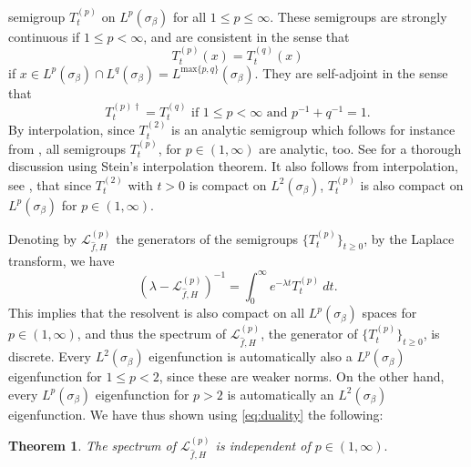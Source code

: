 \documentclass[11pt]{amsart}
\newcommand{\1}{\mathbbm{1}}
\newcommand{\cL}{\mathcal{L}}
\theoremstyle{plain}
\newtheorem{theorem}{Theorem}[section]
\theoremstyle{definition}
\theoremstyle{remark}
\numberwithin{equation}{section}
\begin{document}
semigroup $T^{(p)}_t$ on $L^p(\sigma_\beta)$ for all $1 \le p \le \infty$. These semigroups
are strongly continuous if $1 \le p < \infty$, and are consistent in the
sense that
\[
    T^{(p)}_t(x) = T^{(q)}_t(x)
\]
if $x \in L^p(\sigma_\beta) \cap L^q(\sigma_\beta) = L^{\text{max}\{p,q\}}(\sigma_\beta)$. They are self-adjoint in the sense that
\begin{equation}
\label{eq:duality}
    T^{(p)\dagger}_t = T^{(q)}_t\text{ if }1 \le p < \infty\text{ and }p^{-1} + q^{-1} = 1.
\end{equation}
\noindent By interpolation, since $T^{(2)}_t$ is an analytic semigroup which follows for instance from \cite[Section 4, Theorem 4.6]{engel1999one}, all semigroups $T^{(p)}_t$, for $p \in (1,\infty)$ are analytic, too. See \cite[Theorem 6.6]{Lunardi2018} for a thorough discussion using Stein's interpolation theorem. 
It also follows from interpolation, see \cite[Theorem 3.1]{COBOS1990351}, that since $T^{(2)}_t$ with $t>0$ is compact on $L^2(\sigma_\beta)$, $T^{(p)}_t$ is also compact on $L^p(\sigma_\beta)$ for $p \in (1,\infty)$. 

Denoting by $\mathcal{L}^{(p)}_{\widehat{f},H}$ the generators of the semigroups $\{T^{(p)}_t\}_{t\ge 0}$, by the Laplace transform, we have \[ (\lambda-\cL^{(p)}_{\widehat{f},H})^{-1}  =\int_0^{\infty} e^{-\lambda t} T^{(p)}_t  \ dt.\]
This implies that the resolvent is also compact on all $L^p(\sigma_\beta)$ spaces for $p\in (1,\infty)$, and thus the spectrum of $\mathcal{L}^{(p)}_{\widehat{f},H}$, the generator of $\{T^{(p)}_t\}_{t\ge 0}$, is discrete. Every $L^2(\sigma_\beta)$ eigenfunction is automatically also a $L^p(\sigma_\beta)$ eigenfunction for $1\le p<2$, since these are weaker norms. On the other hand, every $L^p(\sigma_\beta)$ eigenfunction for $p>2$ is automatically an $L^2(\sigma_\beta)$ eigenfunction. We have thus shown using \eqref{eq:duality} the following:
\begin{theorem}
    The spectrum of $\mathcal{L}^{(p)}_{\widehat{f},H}$ is independent of $p \in (1,\infty).$
\end{theorem}
\end{document}

